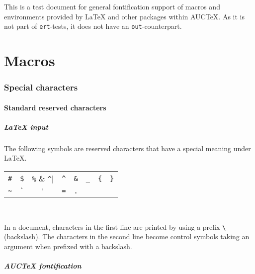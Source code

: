 \documentclass[a4paper]{article}
\begin{document}
This is a test document for general fontification support of macros
and environments provided by \LaTeX{} and other packages within
AUC\TeX.  As it is not part of \verb|ert|-tests, it does not have an
\verb|out|-counterpart.

\part{Macros}

\section{Special characters}

\subsection{Standard reserved characters}

\subsubsection{\protect\LaTeX{} input}

The following symbols are reserved characters that have a special
meaning under \LaTeX{}.
\begin{center}
  \begin{tabular}{@{}*{8}{c}}
    \hline
    \verb|#|   & \verb|$| & \verb|%| & \verb|^|
    & \verb|&| & \verb|_| & \verb|{| & \verb|}| \\
    \verb|~|   & \verb|`| & \verb|'| & \verb|=|
    & \verb|.| \\
    \hline
  \end{tabular}\\
\end{center}
In a document, characters in the first line are printed by using a
prefix \verb|\| (backslash).  The characters in the second line become
control symbols taking an argument when prefixed with a backslash.

\subsubsection{AUC\protect\TeX{} fontification}
\end{document}
